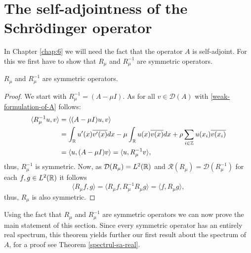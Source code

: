 \section{The self-adjointness of the Schrödinger operator} \label{sec:3.3}

In Chapter \ref{chap:6} we will need the fact that the operator $A$ is self-adjoint. For this we first have to show that $R_{\mu}$ and $R_{\mu}^{-1}$ are symmetric operators.

\begin{theorem} \label{2.2:thm-RmuSymmetric}
	$R_{\mu}$ and $R_{\mu}^{-1}$ are symmetric operators.
	
	\begin{proof}
		We start with $R_{\mu}^{-1} = (A - \mu I)$. As for all $v \in \mathcal{D}(A)$ with \eqref{weak-formulation-of-A} follows:
			\begin{align*}
				\langle R_{\mu}^{-1} u, v \rangle & = \langle (A - \mu I) u, v \rangle \\
					& = \int_{\mathbb{R}} u'(x) \overline{v'(x)} dx -  \mu \int_{\mathbb{R}} u(x) \overline{v(x)} dx + \rho \sum_{i \in \mathbb{Z}} u(x_{i}) \overline{v(x_{i})} \\
					& = \langle u, (A - \mu I) v \rangle = \langle u,  R_{\mu}^{-1} v \rangle,
			\end{align*}
		thus, $R_{\mu}^{-1}$ is symmetric. Now, as $\mathcal{D}(R_{\mu}) = L^{2}(\mathbb{R})$ and $\mathcal{R}(R_{\mu}) = \mathcal{D}(R_{\mu}^{-1})$ for each $f, g \in L^{2}(\mathbb{R})$ it follows
		\[  \langle R_{\mu} f, g \rangle =  \langle R_{\mu} f, R_{\mu}^{-1} R_{\mu} g \rangle = \langle f, R_{\mu} g \rangle, \]
		thus, $R_{\mu}$ is also symmetric.
	\end{proof}
\end{theorem}

Using the fact that $R_{\mu}$ and $R_{\mu}^{-1}$ are symmetric operators we can now prove the main statement of this section. Since every symmetric operator has an entirely real spectrum, this theorem yields further our first result about the spectrum of $A$, for a proof see Theorem \ref{spectrul-sa-real}.

